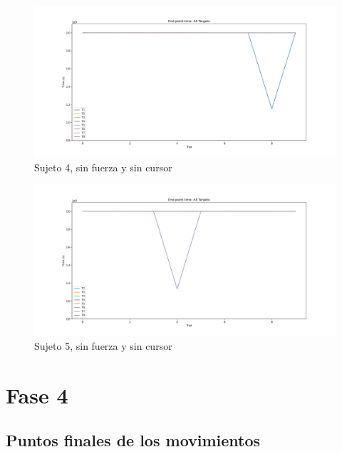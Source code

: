 \documentclass[a4paper,11pt, oneside]{book}
\begin{document}
\begin{figure}[H]
	\includegraphics[width=\linewidth]{sujeto4/no_force_no_cursor/evolution_time}
	\caption{Sujeto 4, sin  fuerza y sin cursor}
	\label{4-3-4}
\end{figure}
\begin{figure}[H]
	\includegraphics[width=\linewidth]{sujeto5/no_force_no_cursor/evolution_time}
	\caption{Sujeto 5, sin  fuerza y sin cursor}
	\label{5-3-4}
\end{figure}



\section{Fase 4}

\subsection{Puntos finales de los movimientos}
\label{anexo:7}
\end{document}
